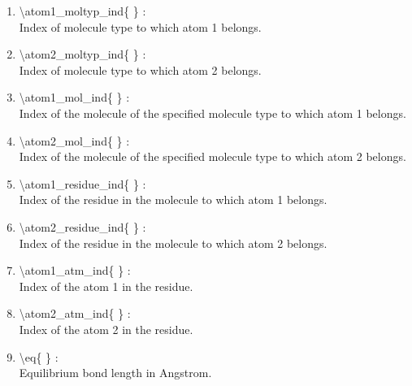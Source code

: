 \documentclass[12pt,titlepage]{article}
\begin{document}
\begin{enumerate}

 \vspace{0.15in} 
 \item  \textbackslash{}atom1\_moltyp\_ind\{ \} : \\ 
    Index of molecule type to which atom 1 belongs.

 \vspace{0.15in} 
 \item  \textbackslash{}atom2\_moltyp\_ind\{ \} : \\ 
    Index of molecule type to which atom 2 belongs.

 \vspace{0.15in} 
 \item  \textbackslash{}atom1\_mol\_ind\{ \} : \\    
    Index of the molecule of the specified molecule type 
    to which atom 1 belongs.

 \vspace{0.15in} 
 \item  \textbackslash{}atom2\_mol\_ind\{ \} : \\    
    Index of the molecule of the specified molecule type 
    to which atom 2 belongs.

 \vspace{0.15in} 
 \item  \textbackslash{}atom1\_residue\_ind\{ \} : \\ 
    Index of the residue in the molecule to which atom 1 belongs.

 \vspace{0.15in} 
 \item  \textbackslash{}atom2\_residue\_ind\{ \} : \\ 
    Index of the residue in the molecule to which atom 2 belongs.

 \vspace{0.15in} 
 \item  \textbackslash{}atom1\_atm\_ind\{ \} : \\    
    Index of the atom 1 in the residue.
 
 \vspace{0.15in} 
 \item  \textbackslash{}atom2\_atm\_ind\{ \} : \\     
    Index of the atom 2 in the residue.
 
 \vspace{0.15in} 
 \item  \textbackslash{}eq\{ \} : \\               
    Equilibrium bond length in Angstrom.
  

\end{enumerate}
\end{document}
